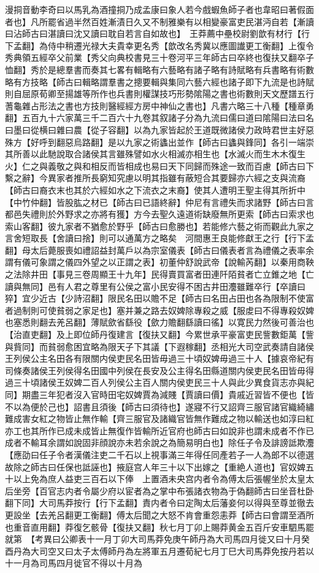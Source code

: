 漫挏音動李奇曰以馬乳為酒撞挏乃成孟康曰象人若今戲蝦魚師子者也韋昭曰著假面者也】凡所罷省過半然百姓漸漬日久又不制雅樂有以相變豪富吏民湛沔自若【漸讀曰沾師古曰湛讀曰沈又讀曰耽自若言自如故也】　王莽薦中壘校尉劉歆有材行【行下孟翻】為侍中稍遷光禄大夫貴幸更名秀【歆改名秀冀以應圖䜟更工衡翻】上復令秀典領五經卒父前業【秀父向典校書見三十卷河平三年師古曰卒終也復扶又翻卒子恤翻】秀於是總羣書而奏其七畧有輯略有六藝略有諸子略有詩賦略有兵書略有術數略有方技略【師古曰輯略謂羣書之摠要輯與集同六藝六經也諸子即下九流是也詩賦則自屈原荀卿至揚雄等所作也兵書則權謀技巧形勢隂陽之書也術數則天文歷譜五行蓍龜雜占形法之書也方技則醫經經方房中神仙之書也】凡書六略三十八種【種章勇翻】五百九十六家萬三千二百六十九卷其叙諸子分為九流曰儒曰道曰隂陽曰法曰名曰墨曰從横曰雜曰農【從子容翻】以為九家皆起於王道既微諸侯力政時君世主好惡殊方【好呼到翻惡烏路翻】是以九家之術蠭出並作【師古曰蠭與鋒同】各引一端崇其所善以此馳說取合諸侯其言雖殊譬如水火相滅亦相生也【水滅火而生木木復生火】仁之與義敬之與和相反而皆相成也易曰天下同歸而殊途一致而百慮【師古曰下繫之辭】今異家者推所長窮知究慮以明其指雖有蔽短合其要歸亦六經之支與流裔【師古曰裔衣末也其於六經如水之下流衣之末裔】使其人遭明王聖主得其所折中【中竹仲翻】皆股肱之材已【師古曰已語終辭】仲尼有言禮失而求諸野【師古曰言都邑失禮則於外野求之亦將有獲】方今去聖久遠道術缺廢無所更索【師古曰索求也索山客翻】彼九家者不猶愈於野乎【師古曰愈勝也】若能修六藝之術而觀此九家之言舍短取長【舍讀曰捨】則可以通萬方之略矣　河間惠王良能修獻王之行【行下孟翻】母太后薨服喪如禮詔益封萬戶以為宗室儀表【師古曰儀表者言為禮儀之表率余謂有儀可象謂之儀四外望之以正謂之表】初董仲舒說武帝【說輸芮翻】以秦用商鞅之法除井田【事見三卷周顯王十九年】民得賣買富者田連阡陌貧者亡立錐之地【亡讀與無同】邑有人君之尊里有公侯之富小民安得不困古井田灋雖難卒行【卒讀曰猝】宜少近古【少詩沼翻】限民名田以贍不足【師古曰名田占田也各為限制不使富者過制則可使貧弱之家足也】塞并兼之路去奴婢除專殺之威【服䖍曰不得專殺奴婢也塞悉則翻去羌呂翻】薄賦歛省繇役【歛力贍翻繇讀曰徭】以寛民力然後可善治也【治直吏翻】及上即位師丹復建言【復扶又翻】今累世承平豪富吏民訾數鉅萬【訾與貲同】而貧弱愈困宜略為限天子下其議【下遐稼翻】丞相光大司空武奏請自諸侯王列侯公主名田各有限關内侯吏民名田皆毋過三十頃奴婢毋過三十人【據哀帝紀有司條奏諸侯王列侯得名田國中列侯在長安及公主得名田縣道關内侯吏民名田皆毋得過三十頃諸侯王奴婢二百人列侯公主百人關内侯吏民三十人與此少異食貨志亦與紀同】期盡三年犯者沒入官時田宅奴婢賈為減賤【賈讀曰價】貴戚近習皆不便也【皆不以為便於己也】詔書且須後【師古曰須待也】遂寢不行又詔齊三服官諸官織綺繡難成害女紅之物皆止無作輸【齊三服官及諸織官皆無作難成之物以輸送也如淳曰紅亦工也其所作已成未成皆止無復作皆輸所近官府也師古曰如說非也謂未成者不作已成者不輸耳余謂如說固非顔說亦未若余說之為簡易明白也】除任子令及誹謗詆欺灋【應劭曰任子令者漢儀注吏二千石以上視事滿三年得任同產若子一人為郎不以德選故除之師古曰任保也詆誣也】掖庭宫人年三十以下出嫁之【重絶人道也】官奴婢五十以上免為庶人益吏三百石以下俸　上置酒未央宫内者令為傅太后張幄坐於太皇太后坐旁【百官志内者令屬少府以宦者為之掌中布張諸衣物為于偽翻師古曰坐音杜卧翻下同】大司馬莽按行【行下孟翻】責内者令曰定陶太后藩妾何以得與至尊並徹去更設坐【去羌呂翻更工衡翻】傅太后聞之大怒不肯會重怨恚莽【師古曰會謂至酒所也重音直用翻】莽復乞骸骨【復扶又翻】秋七月丁卯上賜莽黄金五百斤安車駟馬罷就第　【考異曰公卿表十一月丁卯大司馬莽免庚午師丹為大司馬四月徙又曰十月癸酉丹為大司空又曰太子太傅師丹為左將軍五月遷荀紀七月丁巳大司馬莽免按丹若以十一月為司馬四月徙官不得以十月為